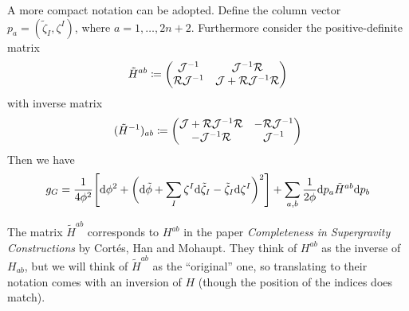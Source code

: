 A more compact notation can be adopted. Define the column vector $p_a=(\tilde \zeta_I,\zeta^I)$, where $a=1,\dots,2n+2$. Furthermore consider the positive-definite matrix
\begin{equation*}
	\tilde H^{ab}\coloneqq 
	\begin{pmatrix}
		\mathcal{J}^{-1} & \mathcal{J}^{-1}\mathcal{R}\\
		\mathcal{R}\mathcal{J}^{-1} & \mathcal{J}+\mathcal{R}\mathcal{J}^{-1}\mathcal{R}
	\end{pmatrix}
\end{equation*}
with inverse matrix
\begin{equation*}
	(\tilde H^{-1})_{ab}\coloneqq 
	\begin{pmatrix}
		\mathcal{J}+\mathcal{R}\mathcal{J}^{-1}\mathcal{R} & -\mathcal{R}\mathcal{J}^{-1}\\
		-\mathcal{J}^{-1}\mathcal{R} & \mathcal{J}^{-1}
	\end{pmatrix}
\end{equation*}
Then we have 
\begin{equation*}
	g_G=\frac{1}{4\phi^2}\Bigg[\mathrm{d} \phi^2
	+\bigg(\mathrm{d} \tilde{\phi}+\sum_I \zeta^I \mathrm{d} \tilde{\zeta}_I-\tilde{\zeta}_I \mathrm{d} \zeta^I\bigg)^2\Bigg]
	+\sum_{a,b}\frac{1}{2\phi}\mathrm{d} p_a \tilde H^{ab} \mathrm{d} p_b
\end{equation*}

\begin{rem}
	The matrix $\tilde H^{ab}$ corresponds to $H^{ab}$ in the paper \emph{Completeness in Supergravity Constructions} by Cort\'es, Han and Mohaupt. They think of $H^{ab}$ as the inverse of $H_{ab}$, but we will think of $\tilde H^{ab}$ as the ``original'' one, so translating to their notation comes with an inversion of $H$ (though the position of the indices does match). 
\end{rem}

